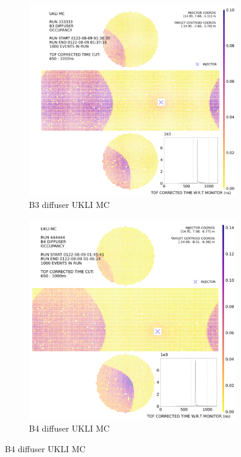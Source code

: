 \begin{figure}[htp]
        \medskip
        
        \begin{subfigure}{0.49\columnwidth}
        \centering
        \includegraphics[width=\textwidth]{Figures/ukli_diff_mc_B3.PNG}
        \caption{B3 diffuser UKLI MC}
        \label{fig:time3}
        \end{subfigure}\hfill
        \begin{subfigure}{0.49\columnwidth}
        \centering
        \includegraphics[width=\textwidth]{Figures/ukli_diff_mc_B4.PNG}
        \caption{B4 diffuser UKLI MC}
        \label{fig:time4}
        \end{subfigure}
        

\end{figure}
